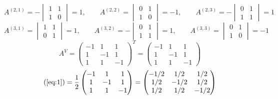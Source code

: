\documentclass[a4paper]{article}
\theoremstyle{definition}
\theoremstyle{plain}
\begin{document}
\begin{equation*}
  A^{(2, 1)} = -
  \begin{vmatrix}
    1 & 1\\
    1 & 0
  \end{vmatrix}
  = 1, \qquad
  A^{(2, 2)} =
  \begin{vmatrix}
    0 & 1\\
    1 & 0
  \end{vmatrix}
  = -1, \qquad
  A^{(2, 3)} = -
  \begin{vmatrix}
    0 & 1\\
    1 & 1
  \end{vmatrix}
  = 1
\end{equation*}
\begin{equation*}
  A^{(3, 1)} =
  \begin{vmatrix}
    1 & 1\\
    0 & 1
  \end{vmatrix}
  = 1, \qquad
  A^{(3, 2)} = -
  \begin{vmatrix}
    0 & 1\\
    1 & 1
  \end{vmatrix}
  = 1, \qquad
  A^{(3, 3)} =
  \begin{vmatrix}
    0 & 1\\
    1 & 0
  \end{vmatrix}
  = -1
\end{equation*}
\begin{equation*}
  A^{V} =
  \begin{pmatrix}
    -1 & 1 & 1\\
    1 & -1 & 1\\
    1 & 1 & -1
  \end{pmatrix}^{T}
  =
  \begin{pmatrix}
    -1 & 1 & 1\\
    1 & -1 & 1\\
    1 & 1 & -1
  \end{pmatrix}
\end{equation*}
\begin{equation*}
  (\ref{eq:1}) =
  \frac{1}{2}
  \begin{pmatrix}
    -1 & 1 & 1\\
    1 & -1 & 1\\
    1 & 1 & -1
  \end{pmatrix}
  =
  \begin{pmatrix}
    -1/2 & 1/2 & 1/2\\
    1/2 & -1/2 & 1/2\\
    1/2 & 1/2 & -1/2
  \end{pmatrix}
\end{equation*}
\end{document}
